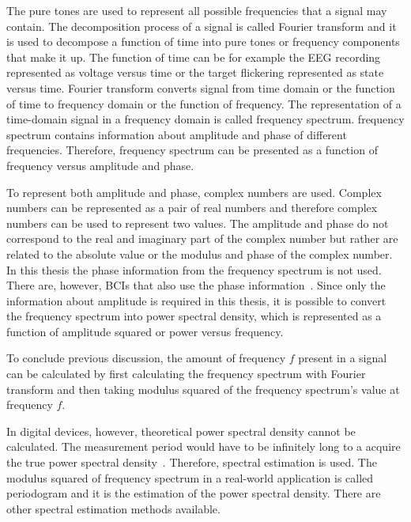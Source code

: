 The \glspl{pure tone} are used to represent all possible frequencies that a signal may contain. The decomposition process of a signal is called \gls{Fourier transform} and it is used to decompose a function of time into \glspl{pure tone} or \glspl{frequency component} that make it up. The function of time can be for example the \gls{EEG} recording represented as voltage versus time or the \gls{target} \gls{flickering} represented as \gls{state} versus time. \Gls{Fourier transform} converts signal from time domain or the function of time to frequency domain or the function of frequency. The representation of a time-domain signal in a frequency domain is called \gls{frequency spectrum}. \Gls{frequency spectrum} contains information about amplitude and phase of different frequencies. Therefore, \gls{frequency spectrum} can be presented as a function of frequency versus amplitude and phase.

To represent both amplitude and phase, complex numbers are used. Complex numbers can be represented as a pair of real numbers and therefore complex numbers can be used to represent two values. The amplitude and phase do not correspond to the real and imaginary part of the complex number but rather are related to the absolute value or the modulus and phase of the complex number. In this thesis the phase information from the \gls{frequency spectrum} is not used. There are, however, \glspl{BCI} that also use the phase information~\cite{MPCC}. Since only the information about amplitude is required in this thesis, it is possible to convert the \gls{frequency spectrum} into \gls{power spectral density}, which is represented as a function of amplitude squared or power versus frequency.

To conclude previous discussion, the amount of frequency $f$ present in a signal can be calculated by first calculating the \gls{frequency spectrum} with \gls{Fourier transform} and then taking modulus squared of the \gls{frequency spectrum}'s value at frequency $f$.

In digital devices, however, theoretical \gls{power spectral density} cannot be calculated. The measurement period would have to be infinitely long to a acquire the true \gls{power spectral density}~\cite{psd}. Therefore, spectral estimation is used. The modulus squared of frequency spectrum in a real-world application is called \gls{periodogram} and it is the estimation of the \gls{power spectral density}. There are other spectral estimation methods available.

